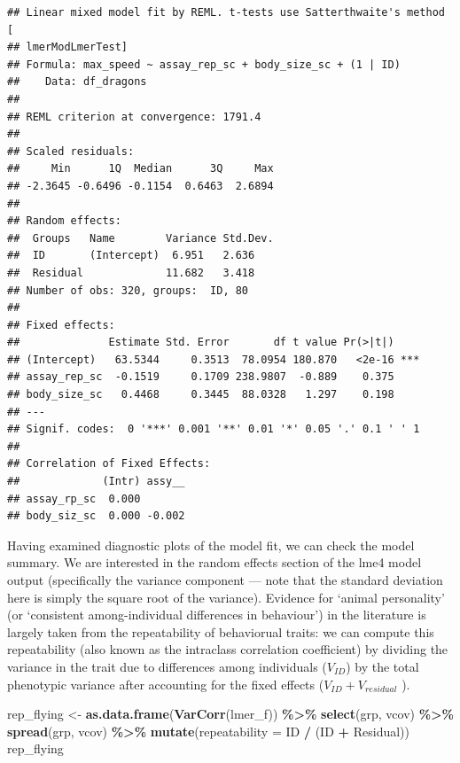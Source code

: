\documentclass[
  12pt,
]{book}
\newenvironment{Shaded}{\begin{snugshade}}{\end{snugshade}}
\newcommand{\DataTypeTok}[1]{\textcolor[rgb]{0.13,0.29,0.53}{#1}}
\newcommand{\KeywordTok}[1]{\textcolor[rgb]{0.13,0.29,0.53}{\textbf{#1}}}
\newcommand{\NormalTok}[1]{#1}
\newcommand{\OperatorTok}[1]{\textcolor[rgb]{0.81,0.36,0.00}{\textbf{#1}}}
\newcommand{\StringTok}[1]{\textcolor[rgb]{0.31,0.60,0.02}{#1}}
\begin{document}
\begin{verbatim}
## Linear mixed model fit by REML. t-tests use Satterthwaite's method [
## lmerModLmerTest]
## Formula: max_speed ~ assay_rep_sc + body_size_sc + (1 | ID)
##    Data: df_dragons
## 
## REML criterion at convergence: 1791.4
## 
## Scaled residuals: 
##     Min      1Q  Median      3Q     Max 
## -2.3645 -0.6496 -0.1154  0.6463  2.6894 
## 
## Random effects:
##  Groups   Name        Variance Std.Dev.
##  ID       (Intercept)  6.951   2.636   
##  Residual             11.682   3.418   
## Number of obs: 320, groups:  ID, 80
## 
## Fixed effects:
##              Estimate Std. Error       df t value Pr(>|t|)    
## (Intercept)   63.5344     0.3513  78.0954 180.870   <2e-16 ***
## assay_rep_sc  -0.1519     0.1709 238.9807  -0.889    0.375    
## body_size_sc   0.4468     0.3445  88.0328   1.297    0.198    
## ---
## Signif. codes:  0 '***' 0.001 '**' 0.01 '*' 0.05 '.' 0.1 ' ' 1
## 
## Correlation of Fixed Effects:
##             (Intr) assy__
## assay_rp_sc  0.000       
## body_siz_sc  0.000 -0.002
\end{verbatim}

Having examined diagnostic plots of the model fit, we can check the model summary. We are interested in the random effects section of the lme4 model output (specifically the variance component --- note that the standard deviation here is simply the square root of the variance). Evidence for `animal personality' (or `consistent among-individual differences in behaviour') in the literature is largely taken from the repeatability of behaviorual traits: we can compute this repeatability (also known as the intraclass correlation coefficient) by dividing the variance in the trait due to differences among individuals (\(V_{ID}\)) by the total phenotypic variance after accounting for the fixed effects (\(V_{ID} + V_{residual}\) ).

\begin{Shaded}
\begin{Highlighting}[]
\NormalTok{rep\_flying \textless{}{-}}\StringTok{ }\KeywordTok{as.data.frame}\NormalTok{(}\KeywordTok{VarCorr}\NormalTok{(lmer\_f)) }\OperatorTok{\%\textgreater{}\%}
\StringTok{  }\KeywordTok{select}\NormalTok{(grp, vcov) }\OperatorTok{\%\textgreater{}\%}
\StringTok{  }\KeywordTok{spread}\NormalTok{(grp, vcov) }\OperatorTok{\%\textgreater{}\%}
\StringTok{  }\KeywordTok{mutate}\NormalTok{(}\DataTypeTok{repeatability =}\NormalTok{ ID }\OperatorTok{/}\StringTok{ }\NormalTok{(ID }\OperatorTok{+}\StringTok{ }\NormalTok{Residual))}
\NormalTok{rep\_flying}
\end{Highlighting}
\end{Shaded}
\end{document}
